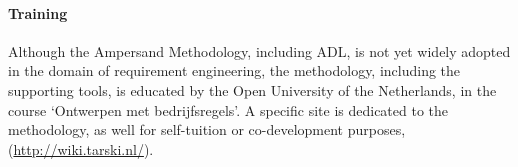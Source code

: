 \paragraph{Training}
Although the Ampersand Methodology, including ADL, is not yet widely adopted in the domain of requirement engineering, the methodology, including the supporting tools, is educated by the Open University of the Netherlands, in the course `Ontwerpen met bedrijfsregels'. A specific site is dedicated to the methodology, as well for self-tuition or co-development purposes, (\url{http://wiki.tarski.nl/}).

\noindent



